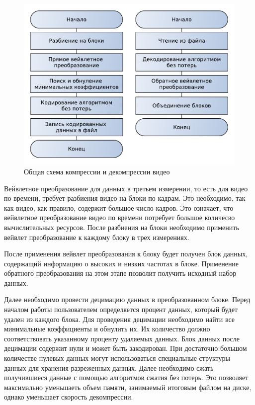 \begin{figure}[ht]
  \centering
  \includegraphics[scale=0.75]{inc/graphics/alg.pdf}
  \caption{Общая схема компрессии и декомпрессии видео}
  \label{fig:figalg}
\end{figure}

Вейвлетное преобразование для данных в третьем измерении, то есть для видео по времени, требует
разбиения видео на блоки по кадрам. Это необходимо, так как видео, как правило, содержит большое число кадров. 
Это означает, что вейвлетное преобразование видео по времени потребует большое количесво вычислительных ресурсов.
После разбиения на блоки необходимо применить вейвлет преобразование к каждому блоку в трех измерениях.

После применения вейвлет преобразования к блоку будет получен блок данных, содержащий
информацию о высоких и низких частотах в блоке. Применение обратного преобразования на этом этапе
позволит получить исходный набор данных.

Далее необходимо провести децимацию данных в преобразованном блоке. 
Перед началом работы пользователем определяется процент данных, который будет удален из каждого блока.
Для проведения децимации необходимо найти все минимальные коэффициенты и обнулить их. Их количество 
должно соответствовать указанному проценту удаляемых данных.
Блок данных после децимации содержит нули и может быть закодирован. При достаточно большом количестве нулевых данных
могут использоваться специальные структуры данных для хранения разреженных данных. 
Далее необходимо сжать получившиеся данные с помощью алгоритмов сжатия без потерь. Это позволяет
максимально уменьшаеть объем памяти, занимаемый итоговым файлом на диске, однако уменьшает скорость декомпрессии. 

